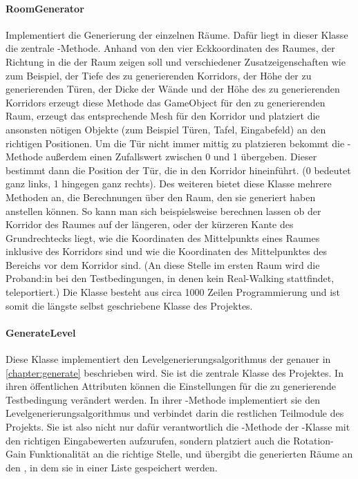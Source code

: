\begin{multicols*}{2}
    \paragraph{RoomGenerator}
    Implementiert die Generierung der einzelnen Räume. Dafür liegt in dieser Klasse die zentrale -Methode. Anhand von den vier Eckkoordinaten des Raumes, der Richtung in die der Raum zeigen soll und verschiedener Zusatzeigenschaften wie zum Beispiel, der Tiefe des zu generierenden Korridors, der Höhe der zu generierenden Türen, der Dicke der Wände und der Höhe des zu generierenden Korridors erzeugt diese Methode das GameObject für den zu generierenden Raum, erzeugt das entsprechende Mesh für den Korridor und platziert die ansonsten nötigen Objekte (zum Beispiel Türen, Tafel, Eingabefeld) an den richtigen Positionen. Um die Tür nicht immer mittig zu platzieren bekommt die -Methode außerdem einen Zufallswert zwischen 0 und 1 übergeben. Dieser bestimmt dann die Position der Tür, die in den Korridor hineinführt. (0 bedeutet ganz links, 1 hingegen ganz rechts).
    Des weiteren bietet diese Klasse mehrere Methoden an, die Berechnungen über den Raum, den sie generiert haben anstellen können. So kann man sich beispielsweise berechnen lassen ob der Korridor des Raumes auf der längeren, oder der kürzeren Kante des Grundrechtecks liegt, wie die Koordinaten des Mittelpunkts eines Raumes inklusive des Korridors sind und wie die Koordinaten des Mittelpunktes des Bereichs vor dem Korridor sind. (An diese Stelle im ersten Raum wird die Proband:in bei den Testbedingungen, in denen kein Real-Walking stattfindet, teleportiert.) Die Klasse besteht aus circa 1000 Zeilen Programmierung und ist somit die längste selbst geschriebene Klasse des Projektes.

    \paragraph{GenerateLevel}
    Diese Klasse implementiert den Levelgenerierungsalgorithmus der genauer in \autoref{chapter:generate}
    beschrieben wird. Sie ist die zentrale Klasse des Projektes. In ihren öffentlichen Attributen können die Einstellungen für die zu generierende Testbedingung verändert werden. In ihrer -Methode implementiert sie den Levelgenerierungsalgorithmus und verbindet darin die restlichen Teilmodule des Projekts. Sie ist also nicht nur dafür verantwortlich die -Methode der -Klasse mit den richtigen Eingabewerten aufzurufen, sondern platziert auch die Rotation-Gain Funktionalität an die richtige Stelle, und übergibt die generierten Räume an den , in dem sie in einer Liste gespeichert werden.


\end{multicols*}
